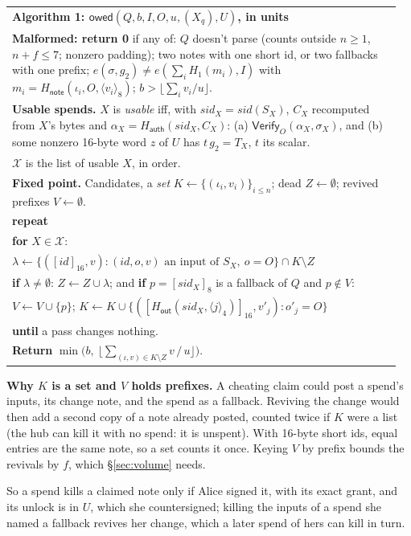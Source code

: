 \documentclass[11pt]{article}
\theoremstyle{plain}
\theoremstyle{definition}
\newcommand{\be}[2]{\langle #1\rangle_{#2}}
\newcommand{\pre}[2]{[#1]_{#2}}
\newcommand{\Ht}[1]{H_{\textsf{#1}}}
\newcommand{\Vfy}{\mathsf{Verify}}
\newcommand{\sid}{\mathit{sid}}
\newcommand{\owed}{\mathsf{owed}}
\newcommand{\Hg}{H_{1}}
\newenvironment{algobox}[1]
  {\par\smallskip\noindent\begin{tabular}{|p{0.955\linewidth}|}\hline\textbf{#1}\\[2pt]}
  {\\\hline\end{tabular}\par\smallskip}
\begin{document}
\begin{algobox}{Algorithm 1: $\owed(Q, b, I, O, u, (X_q), U)$, in units}
\textbf{Malformed: return 0} if any of:
$Q$ doesn't parse (counts outside $n \ge 1$, $n + f \le 7$; nonzero padding);
two notes with one short id, or two fallbacks with one prefix;
$e(\sigma, g_2) \ne e(\sum_i \Hg(m_i), I)$ with $m_i = \Ht{note}(\iota_i, O, \be{v_i}{8})$;
$b > \lfloor \sum_i v_i / u\rfloor$.\\[3pt]
\textbf{Usable spends.} $X$ is \emph{usable} iff, with $\sid_X = \sid(S_X)$,
$C_X$ recomputed from $X$'s bytes and $\alpha_X = \Ht{auth}(\sid_X, C_X)$:
\quad (a) $\Vfy_O(\alpha_X, \sigma_X)$, and
\quad (b) some nonzero 16-byte word $z$ of $U$ has $t\,g_2 = T_X$, $t$ its scalar.\\
$\mathcal{X}$ is the list of usable $X$, in order.\\[3pt]
\textbf{Fixed point.} Candidates, a \emph{set} $K \leftarrow \{(\iota_i, v_i)\}_{i \le n}$; dead $Z \leftarrow \emptyset$; revived prefixes $V \leftarrow \emptyset$.\\
\textbf{repeat}\\
\quad \textbf{for} $X \in \mathcal{X}$:\\
\quad\quad $\lambda \leftarrow \{(\pre{\mathit{id}}{16}, v) : (\mathit{id}, o, v) \text{ an input of } S_X,\ o = O\} \cap K \setminus Z$\\
\quad\quad \textbf{if} $\lambda \ne \emptyset$: $Z \leftarrow Z \cup \lambda$; and \textbf{if} $p = \pre{\sid_X}{8}$ is a fallback of $Q$ and $p \notin V$:\\
\quad\quad\quad $V \leftarrow V \cup \{p\}$; $K \leftarrow K \cup \{(\pre{\Ht{out}(\sid_X, \be{j}{4})}{16}, v'_j) : o'_j = O\}$\\
\textbf{until} a pass changes nothing.\\[3pt]
\textbf{Return} $\min\big(b,\ \big\lfloor \sum_{(\iota, v) \in K \setminus Z} v \,/\, u \big\rfloor\big)$.
\end{algobox}

\textbf{Why $K$ is a set and $V$ holds prefixes.} A cheating claim
could post a spend's inputs, its change note, and the spend as a
fallback. Reviving the change would then add a second copy of a note
already posted, counted twice if $K$ were a list (the hub can kill it
with no spend: it is unspent). With 16-byte short ids, equal entries are
the same note, so a set counts it once. Keying $V$ by prefix bounds the
revivals by $f$, which \S\ref{sec:volume} needs.

So a spend kills a claimed note only if Alice signed it, with its exact
grant, and its unlock is in $U$, which she countersigned; killing the
inputs of a spend she named a fallback revives her change, which a later
spend of hers can kill in turn.
\end{document}
